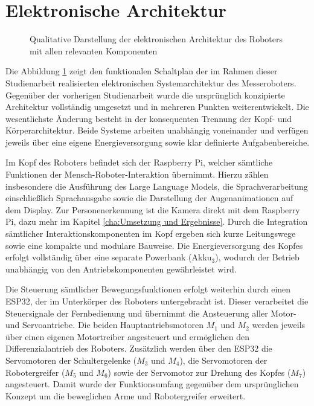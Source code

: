 \section{Elektronische Architektur}
\label{cha:Elektronische Architektur}

\vspace{0.5cm}
\begin{figure}[H]
	\centering
		
	\vspace{1cm}
	\caption{Qualitative Darstellung der elektronischen Architektur des Roboters mit allen relevanten Komponenten}		
	\label{fig:Konstruktions_Plan}
\end{figure}


Die Abbildung \ref{fig:Konstruktions_Plan} zeigt den funktionalen Schaltplan der im Rahmen dieser Studienarbeit realisierten elektronischen Systemarchitektur des Messeroboters. Gegenüber der vorherigen Studienarbeit wurde die ursprünglich konzipierte Architektur vollständig umgesetzt und in mehreren Punkten weiterentwickelt. Die wesentlichste Änderung besteht in der konsequenten Trennung der Kopf- und Körperarchitektur. Beide Systeme arbeiten unabhängig voneinander und verfügen jeweils über eine eigene Energieversorgung sowie klar definierte Aufgabenbereiche.

Im Kopf des Roboters befindet sich der Raspberry Pi, welcher sämtliche Funktionen der Mensch-Roboter-Interaktion übernimmt. Hierzu zählen insbesondere die Ausführung des Large Language Models, die Sprachverarbeitung einschließlich Sprachausgabe sowie die Darstellung der Augenanimationen auf dem Display. Zur Personenerkennung ist die Kamera direkt mit dem Raspberry Pi, dazu mehr im Kapitel \ref{cha:Umsetzung und Ergebnisse}. Durch die Integration sämtlicher Interaktionskomponenten im Kopf ergeben sich kurze Leitungswege sowie eine kompakte und modulare Bauweise. Die Energieversorgung des Kopfes erfolgt vollständig über eine separate Powerbank (Akku$_3$), wodurch der Betrieb unabhängig von den Antriebskomponenten gewährleistet wird.

Die Steuerung sämtlicher Bewegungsfunktionen erfolgt weiterhin durch einen ESP32, der im Unterkörper des Roboters untergebracht ist. Dieser verarbeitet die Steuersignale der Fernbedienung und übernimmt die Ansteuerung aller Motor- und Servoantriebe. Die beiden Hauptantriebsmotoren $M_1$ und $M_2$ werden jeweils über einen eigenen Motortreiber angesteuert und ermöglichen den Differenzialantrieb des Roboters. Zusätzlich werden über den ESP32 die Servomotoren der Schultergelenke ($M_3$ und $M_4$), die Servomotoren der Robotergreifer ($M_5$ und $M_6$) sowie der Servomotor zur Drehung des Kopfes ($M_7$) angesteuert. Damit wurde der Funktionsumfang gegenüber dem ursprünglichen Konzept um die beweglichen Arme und Robotergreifer erweitert.

